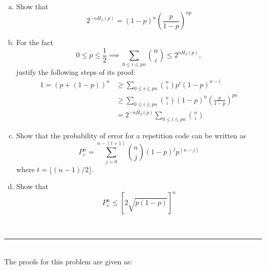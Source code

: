 \documentclass{article}
\newcommand{\statementsep}{\leavevmode\\[0.005in] \rule[\baselineskip/4]{\textwidth}{0.4pt}\leavevmode\\[0.005in]}
\begin{document}
\begin{enumerate}[(a)]
	\item Show that 
\begin{equation*}
	2^{-nH_2(p)} = (1 - p)^n\left ( \frac{p}{1 - p}\right )^{np}
\end{equation*}
	\item For the fact 
\begin{equation*}
	0 \le p \le \frac{1}{2} \implies \sum_{0 \le i \le pn} {n \choose i} \le 2^{nH_2(p)},
\end{equation*}
justify the following steps of its proof:
\begin{equation*}\begin{aligned}
	1 = (p + (1 - p))^n & \ge \sum_{0 \le i \le pn} {n \choose i}p^i(1 - p)^{n - i} \\ 
  & \ge \sum_{0 \le i \le pn}{n \choose i}(1 - p)^n\left ( \frac{p}{1 - p}\right )^{pn} \\
  & = 2^{-nH_2(p)} \sum_{0 \le i \le pn}{n \choose i}
\end{aligned}\end{equation*}
\item Show that the probability of error for a repetition code can be written as
\begin{equation*}
	P_e^n = \sum_{j=0}^{n-(t+1)} {n \choose j}(1 - p)^jp^{(n-j)}
\end{equation*}
where $t = \lfloor (n - 1)/2 \rfloor$.

\item Show that 
\begin{equation*}
	P_e^n \le \left [ 2\sqrt{p(1-p)}\right ]^n
\end{equation*}
\end{enumerate}
\statementsep
The proofs for this problem are given as:
\end{document}

